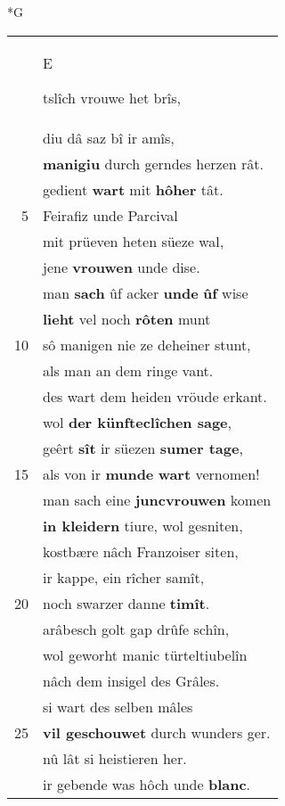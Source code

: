 \documentclass[8pt,a4paper,notitlepage]{article}
\begin{document}
\begin{table}[ht]
\begin{minipage}[t]{0.5\linewidth}
\small
\begin{center}*G
\end{center}
\begin{tabular}{rl}
 & \begin{large}E\end{large}tslîch vrouwe het brîs,\\ 
 & diu dâ saz bî ir amîs,\\ 
 & \textbf{manigiu} durch gerndes herzen rât.\\ 
 & gedient \textbf{wart} mit \textbf{hôher} tât.\\ 
5 & Feirafiz unde Parcival\\ 
 & mit prüeven heten süeze wal,\\ 
 & jene \textbf{vrouwen} unde dise.\\ 
 & man \textbf{sach} ûf acker \textbf{unde} \textbf{ûf} wise\\ 
 & \textbf{lieht} vel noch \textbf{rôten} munt\\ 
10 & sô manigen nie ze deheiner stunt,\\ 
 & als man an dem ringe vant.\\ 
 & des wart dem heiden vröude erkant.\\ 
 & wol \textbf{der künfteclîchen sage},\\ 
 & geêrt \textbf{sît} ir süezen \textbf{sumer tage},\\ 
15 & als von ir \textbf{munde} \textbf{wart} vernomen!\\ 
 & man sach eine \textbf{juncvrouwen} komen\\ 
 & \textbf{in kleidern} tiure, wol gesniten,\\ 
 & kostbære nâch Franzoiser siten,\\ 
 & ir kappe, ein rîcher samît,\\ 
20 & noch swarzer danne \textbf{timît}.\\ 
 & arâbesch golt gap drûfe schîn,\\ 
 & wol geworht manic türteltiubelîn\\ 
 & nâch dem insigel des Grâles.\\ 
 & si wart des selben mâles\\ 
25 & \textbf{vil geschouwet} durch wunders ger.\\ 
 & nû lât si heistieren her.\\ 
 & ir gebende was hôch unde \textbf{blanc}.\\ 

\end{tabular}
\end{minipage}
\end{table}
\end{document}
